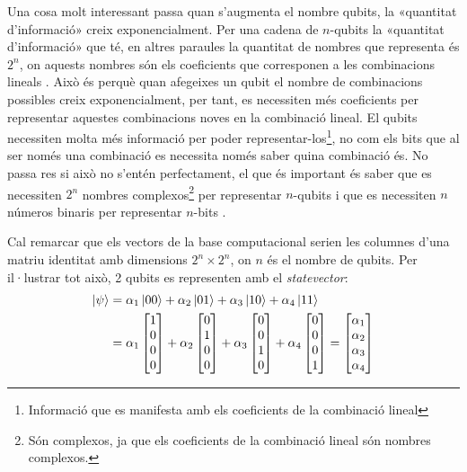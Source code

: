 Una cosa molt interessant passa quan s'augmenta el nombre qubits, la «quantitat d'informació» creix exponencialment. Per una cadena de $n$-qubits la «quantitat d'informació» que té, en altres paraules la quantitat de nombres que representa és $2^n$, on aquests nombres són els coeficients que corresponen a les combinacions lineals . Això és perquè quan afegeixes un qubit el nombre de combinacions possibles creix exponencialment, per tant, es necessiten més coeficients per representar aquestes combinacions noves en la combinació lineal. El qubits necessiten molta més informació per poder representar-los\footnote{Informació que es manifesta amb els coeficients de la combinació lineal}, no com els bits que al ser només una combinació es necessita només saber quina combinació és. No passa res si això no s'entén perfectament, el que és important és saber que es necessiten $2^n$ nombres complexos\footnote{Són complexos, ja que els coeficients de la combinació lineal són nombres complexos.} per representar $n$-qubits i que es necessiten $n$ números binaris per representar $n$-bits \cite{QCandQI:qubits}.


Cal remarcar que els vectors de la base computacional serien les columnes d'una matriu identitat amb dimensions $2^n\times 2^n$, on $n$ és el nombre de qubits. Per il·lustrar tot això, 2 qubits es representen amb el \textit{statevector}:
\begin{align*}
	\ket{\psi} &= \alpha_1\ket{00} + \alpha_2\ket{01} + \alpha_3\ket{10} + \alpha_4\ket{11}\\
	&= \alpha_1\begin{bmatrix} 1 \\ 0 \\ 0 \\ 0 \end{bmatrix} + \alpha_2 \begin{bmatrix} 0 \\ 1 \\ 0 \\ 0 \end{bmatrix} + \alpha_3 \begin{bmatrix} 0 \\ 0 \\ 1 \\ 0 \end{bmatrix} + \alpha_4\begin{bmatrix} 0 \\ 0 \\ 0 \\ 1 \end{bmatrix} 
	= \begin{bmatrix} \alpha_1 \\ \alpha_2 \\ \alpha_3 \\ \alpha_4 \end{bmatrix}
\end{align*}

